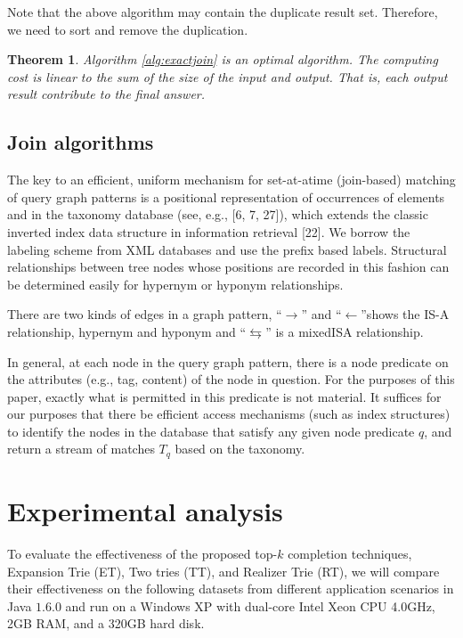 \documentclass{sig-alternate}
\newtheorem{theorem}{Theorem}
\begin{document}
Note that the above algorithm may contain the duplicate result set. Therefore, we need to sort and remove the duplication.

\begin{theorem}  Algorithm \ref{alg:exactjoin} is an optimal algorithm. The computing cost is linear to the sum of the size of the input and output. That is, each output result contribute to the final answer.
\end{theorem}

\subsection{Join algorithms}

The key to an efficient, uniform mechanism for set-at-atime
(join-based) matching of query graph patterns is a positional
representation of occurrences of  elements and in the taxonomy database (see, e.g., [6, 7, 27]),
which extends the classic inverted index data structure in information retrieval [22]. We borrow the labeling scheme from XML databases and use the prefix based labels. Structural relationships between tree nodes whose positions
are recorded in this fashion can be determined easily for hypernym or hyponym relationships.

There are two kinds of edges in a graph pattern, ``$\rightarrow$'' and ``$\leftarrow$''shows the IS-A relationship, hypernym and hyponym and ``$\leftrightarrows$'' is a mixedISA relationship.

In general, at each node in the query graph pattern, there is
a node predicate on the attributes (e.g., tag, content) of the
node in question. For the purposes of this paper, exactly
what is permitted in this predicate is not material.  It suffices
for our purposes that there be efficient access mechanisms
(such as index structures) to identify the nodes in the
database that satisfy any given node predicate $q$, and
return a stream of matches $T_q$ based on the taxonomy.




\section{Experimental analysis}

To evaluate the effectiveness of the proposed top-$k$ completion
techniques, Expansion Trie (ET), Two tries (TT), and  Realizer Trie (RT), we will compare
their effectiveness on the following datasets from different
application scenarios in Java $1.6.0$ and run on a
Windows XP with dual-core Intel Xeon CPU 4.0GHz, 2GB RAM, and a 320GB hard disk.
\end{document}
